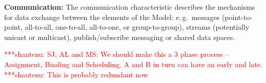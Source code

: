 \documentclass[conference,final]{IEEEtran}
\newcommand{\jhanote}[1]{ {\textcolor{red} { ***shantenu: #1 }}}
\newcommand{\alnote}[1]{ {\textcolor{blue} { ***andre: #1 }}}
\newcommand{\alnote}[1]{}
\newcommand{\jhanote}[1]{}
\begin{document}

\textbf{Communication:} The communication characteristic describes the
mechanisms for data exchange between the elements of the Model:
e.\,g.\ messages (point-to-point, all-to-all, one-to-all, all-to-one,
or group-to-group), streams (potentially unicast or multicast),
publish/subscribe messaging or shared data spaces.
		



\jhanote{SJ, AL and MS: We should make this a 3 phase process --
  Assignment, Binding and Scheduling. A and B in turn can have an
  early and late.}\jhanote{This is probably redundant now}

\end{document}
